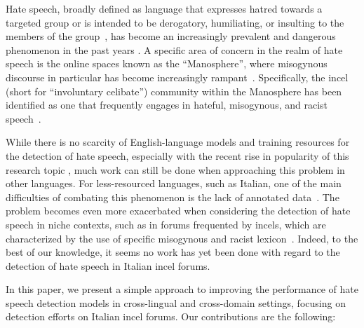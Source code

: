 \documentclass[11pt]{article}
\begin{document}
Hate speech, broadly defined as language that expresses hatred towards a targeted group or is intended to be derogatory, humiliating, or insulting to the members of the group~\cite{davidson-2017-automated-hate}, has become an increasingly prevalent and dangerous phenomenon in the past years \cite{matamoros-fernandezRacismHateSpeech2021}.
 A specific area of concern in the realm of hate speech is the online spaces known as the ``Manosphere'', where misogynous discourse in particular has become increasingly rampant~\cite{ribeiro2021evolution-manosphere}.
Specifically, the incel (short for ``involuntary celibate'') community within the Manosphere has been identified as one that frequently engages in hateful, misogynous, and racist speech~\cite{nagle-2017-kill-normies,jakiOnlineHatredWomen2019}.

While there is no scarcity of English-language models and training resources for 
the detection of hate speech, especially with the recent rise in popularity of 
this research topic \cite{alkomahLiteratureReviewTextual2022}, 
much work can still be done when approaching this problem in other languages.
For less-resourced languages, such as Italian, one of the main difficulties of combating this phenomenon is the lack of annotated data~\cite{van2023mitigating}. The problem becomes even more 
exacerbated when considering the detection of hate speech in niche contexts, 
such as in forums frequented by incels, which are characterized by the use of 
specific misogynous and racist lexicon~\cite{gothard2020ExploringIncelLanguage}. Indeed, to the best of our knowledge, it seems no work has yet been done with regard to the detection of hate speech in Italian incel forums.

In this paper, we present a simple approach to improving the performance of hate speech detection models in cross-lingual and cross-domain settings, focusing on detection efforts on Italian incel forums. Our contributions are the following:
\end{document}

